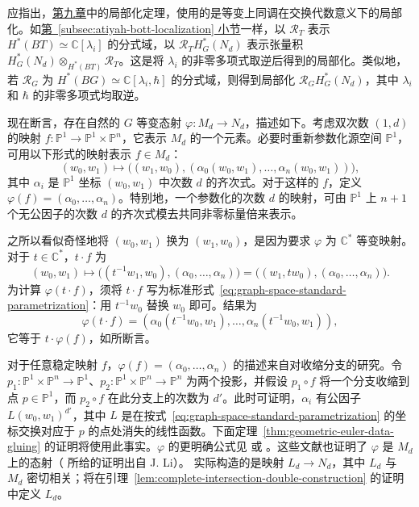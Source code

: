 应指出，\hyperref[chap:localization]{第九章}中的局部化定理，使用的是等变上同调在交换代数意义下的局部化。如\hyperref[subsec:atiyah-bott-localization]{第~\ref*{subsec:atiyah-bott-localization} 小节}一样，以 $\mathcal R_T$ 表示 $H^*(BT)\simeq\mathbb C[\lambda_i]$ 的分式域，以 $\mathcal R_TH_G^*(N_d)$ 表示张量积 $H_G^*(N_d)\otimes_{H^*(BT)}\mathcal R_T$。这是将 $\lambda_i$ 的非零多项式取逆后得到的局部化。类似地，若 $\mathcal R_G$ 为 $H^*(BG)\simeq\mathbb C[\lambda_i,\hbar]$ 的分式域，则得到局部化 $\mathcal R_GH_G^*(N_d)$，其中 $\lambda_i$ 和 $\hbar$ 的非零多项式均取逆。

现在断言，存在自然的 $G$ 等变态射 $\varphi:M_d\to N_d$，描述如下。考虑双次数 $(1,d)$ 的映射 $f:\mathbb P^1\to\mathbb P^1\times\mathbb P^n$，它表示 $M_d$ 的一个元素。必要时重新参数化源空间 $\mathbb P^1$，可用以下形式的映射表示 $f\in M_d$：
\begin{equation}\label{eq:graph-space-standard-parametrization}
(w_0,w_1)\longmapsto\bigl((w_1,w_0),
(\alpha_0(w_0,w_1),\ldots,\alpha_n(w_0,w_1))\bigr),
\end{equation}
其中 $\alpha_i$ 是 $\mathbb P^1$ 坐标 $(w_0,w_1)$ 中次数 $d$ 的齐次式。对于这样的 $f$，定义 $\varphi(f)=(\alpha_0,\ldots,\alpha_n)$。特别地，一个参数化的次数 $d$ 的映射，可由 $\mathbb P^1$ 上 $n+1$ 个无公因子的次数 $d$ 的齐次式模去共同非零标量倍来表示。

之所以看似奇怪地将 $(w_0,w_1)$ 换为 $(w_1,w_0)$，是因为要求 $\varphi$ 为 $\mathbb C^*$ 等变映射。对于 $t\in\mathbb C^*$，$t\cdot f$ 为
\[
(w_0,w_1)\longmapsto\bigl((t^{-1}w_1,w_0),(\alpha_0,\ldots,\alpha_n)\bigr)
=\bigl((w_1,tw_0),(\alpha_0,\ldots,\alpha_n)\bigr).
\]
为计算 $\varphi(t\cdot f)$，须将 $t\cdot f$ 写为标准形式~\eqref{eq:graph-space-standard-parametrization}：用 $t^{-1}w_0$ 替换 $w_0$ 即可。结果为
\[
\varphi(t\cdot f)
=(\alpha_0(t^{-1}w_0,w_1),\ldots,\alpha_n(t^{-1}w_0,w_1)),
\]
它等于 $t\cdot\varphi(f)$，如所断言。

对于任意稳定映射 $f$，$\varphi(f)=(\alpha_0,\ldots,\alpha_n)$ 的描述来自对收缩分支的研究。令 $p_1:\mathbb P^1\times\mathbb P^n\to\mathbb P^1$、$p_2:\mathbb P^1\times\mathbb P^n\to\mathbb P^n$ 为两个投影，并假设 $p_1\circ f$ 将一个分支收缩到点 $p\in\mathbb P^1$，而 $p_2\circ f$ 在此分支上的次数为 $d'$。此时可证明，$\alpha_i$ 有公因子 $L(w_0,w_1)^{d'}$，其中 $L$ 是在按式~\eqref{eq:graph-space-standard-parametrization} 的坐标交换对应于 $p$ 的点处消失的线性函数。下面定理~\ref{thm:geometric-euler-data-gluing} 的证明将使用此事实。$\varphi$ 的更明确公式见  或 。这些文献也证明了 $\varphi$ 是 $M_d$ 上的态射（ 所给的证明出自 J. Li）。 实际构造的是映射 $L_d\to N_d$，其中 $L_d$ 与 $M_d$ 密切相关；将在引理~\ref{lem:complete-intersection-double-construction} 的证明中定义 $L_d$。

